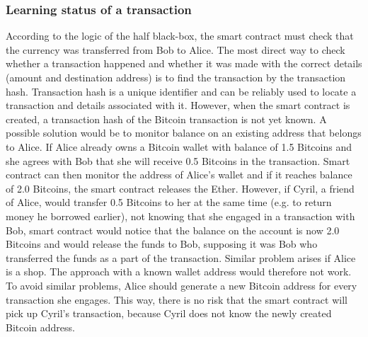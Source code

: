 \subsubsection{Learning status of a transaction}
According to the logic of the half black-box, the smart contract must check that the currency was transferred from Bob to Alice. The most direct way to check whether a transaction happened and whether it was made with the correct details (amount and destination address) is to find the transaction by the transaction hash. Transaction hash is a unique identifier and can be reliably used to locate a transaction and details associated with it. However, when the smart contract is created, a transaction hash of the Bitcoin transaction is not yet known.
% 
A possible solution would be to monitor balance on an existing address that belongs to Alice. If Alice already owns a Bitcoin wallet with balance of 1.5 Bitcoins and she agrees with Bob that she will receive 0.5 Bitcoins in the transaction. Smart contract can then monitor the address of Alice's wallet and if it reaches balance of 2.0 Bitcoins, the smart contract releases the Ether. However, if Cyril, a friend of Alice, would transfer 0.5 Bitcoins to her at the same time (e.g. to return money he borrowed earlier), not knowing that she engaged in a transaction with Bob, smart contract would notice that the balance on the account is now 2.0 Bitcoins and would release the funds to Bob, supposing it was Bob who transferred the funds as a part of the transaction. Similar problem arises if Alice is a shop. The approach with a known wallet address would therefore not work. To avoid similar problems, Alice should generate a new Bitcoin address for every transaction she engages. This way, there is no risk that the smart contract will pick up Cyril's transaction, because Cyril does not know the newly created Bitcoin address\footnotemark.
% 
